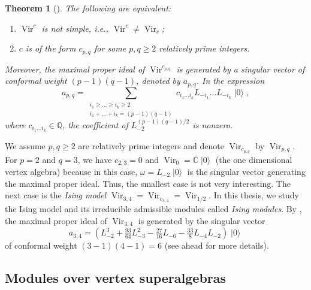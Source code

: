 \documentclass[a4paper, 12pt, reqno]{amsart}
\newtheorem{theorem}{Theorem}[section]
\theoremstyle{remark}
\DeclareMathOperator{\Vir}{Vir}
\DeclareMathOperator{\vac}{|0\rangle}
\begin{document}
\begin{theorem}[{\cite{gorelik_simplicity_2007}}]
  \label{thr:23}
  The following are equivalent:
  \begin{enumerate}
  \item $\Vir^c$ is not simple, i.e., $\Vir^c \neq \Vir_c$;
  \item $c$ is of the form $c_{p, q}$ for some $p, q \ge 2$ relatively prime integers.
  \end{enumerate}
  Moreover, the maximal proper ideal of $\Vir^{c_{p, q}}$ is generated by a singular vector of conformal weight $(p - 1)(q - 1)$, denoted by $a_{p, q}$.
  In the expression
  \begin{equation*}
    a_{p, q} = \sum_{\substack{i_1 \ge \dots \ge i_k \ge 2 \\ i_1 + \dots + i_k = (p - 1)(q - 1)}}c_{i_1\dots i_k}L_{-i_1}\dots L_{-i_k}\vac,
  \end{equation*}
  where $c_{i_1\dots i_k} \in \mathbb{Q}$, the coefficient of $L_{-2}^{(p - 1)(q - 1)/2}$ is nonzero.
\end{theorem}

We assume $p, q \ge 2$ are relatively prime integers and denote $\Vir_{c_{p, q}}$ by $\Vir_{p, q}$.
For $p = 2$ and $q = 3$, we have $c_{2, 3} = 0$ and $\Vir_0 = \mathbb{C}\vac$ (the one dimensional vertex algebra) because in this case, $\omega = L_{-2}\vac$ is the singular vector generating the maximal proper ideal.
Thus, the smallest case is not very interesting.
The next case is the \emph{Ising model} $\Vir_{3, 4} = \Vir_{c_{3, 4}} = \Vir_{1/2}$.
In this thesis, we study the Ising model and its irreducible admissible modules called \emph{Ising modules}.
By , the maximal proper ideal of $\Vir_{3, 4}$ is generated by the singular vector
\begin{equation}
  \label{eq:22}
  a_{3, 4} = (L_{-2}^3 + \tfrac{93}{64}L_{-3}^2 - \tfrac{27}{16}L_{-6} - \tfrac{33}{8}L_{-4}L_{-2})\vac
\end{equation}
of conformal weight $(3 - 1)(4 - 1) = 6$ (see  ahead for more details).

\subsection{Modules over vertex superalgebras}
\label{sec:modules-over-vertex}
\end{document}

